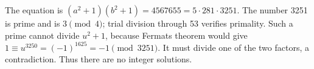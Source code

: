 The equation is $(a^2+1)(b^2+1)=4567655=5\cdot281\cdot3251$. The number 3251 is prime and is $3\pmod4$; trial division through 53 verifies primality. Such a prime cannot divide $u^2+1$, because Fermat\textquotesingle s theorem would give $1\equiv u^{3250}=(-1)^{1625}=-1\pmod{3251}$. It must divide one of the two factors, a contradiction. Thus there are no integer solutions.
